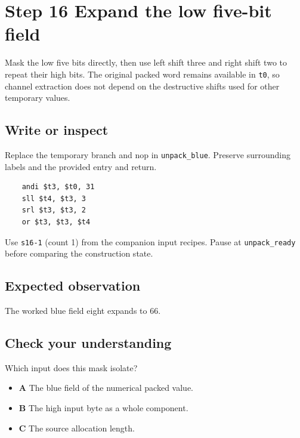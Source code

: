 \section{Step 16 Expand the low five-bit field}\label{rgb-s16}

Mask the low five bits directly, then use left shift three and right shift two to repeat their high bits. The original packed word remains available in \texttt{t0}, so channel extraction does not depend on the destructive shifts used for other temporary values.

\subsection{Write or inspect}
Replace the temporary branch and nop in \texttt{unpack\_blue}. Preserve surrounding labels and the provided entry and return.

\begin{verbatim}
    andi $t3, $t0, 31
    sll $t4, $t3, 3
    srl $t3, $t3, 2
    or $t3, $t3, $t4
\end{verbatim}
Use \texttt{s16-1} (count 1) from the companion input recipes. Pause at \texttt{unpack\_ready} before comparing the construction state.

\subsection{Expected observation}
The worked blue field eight expands to 66.

\subsection{Check your understanding}
Which input does this mask isolate?

\begin{itemize}
  \item \textbf{A} The blue field of the numerical packed value.
  \item \textbf{B} The high input byte as a whole component.
  \item \textbf{C} The source allocation length.
\end{itemize}
